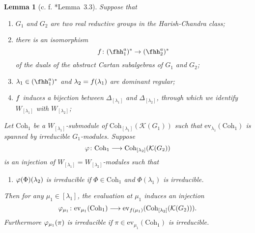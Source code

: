 \documentclass[12pt,a4paper]{amsart}
\newcommand{\CK}{{\mathcal {K}}}
\numberwithin{equation}{section}
\newtheorem{lem}[thm]{Lemma}
\theoremstyle{remark}
\def\Coh{\mathrm{Coh}}
\def\ev#1{{\mathrm{ev}_{#1}}}
\begin{document}
\begin{lem}[{c. f. \cite{GI}*{Lemma~3.3}}]\label{lem:ff.irr} Suppose that
  \begin{enumerate}[label=(\roman*),series=KLff]
    \item \label{it:KLff.1} $G_{1}$ and $G_{2}$ are two real reductive groups in
          the Harish-Chandra class;
    \item there is an isomorphism
          \[ \ff\colon \fhhaso\rightarrow \fhhast
          \]
          of the duals of the abstract Cartan subalgebras of $G_{1}$ and
          $G_{2}$;
    \item $\lambda_{1} \in \fhhaso$ and $\lambda_{2} = f(\lambda_{1})$ are
          dominant regular;
    \item %
          $f$ induces a bijection between $\Delta _{[\lambda_{1}]}$ and
          $\Delta _{[\lambda_{2}]}$, through which we identify
          $W_{[\lambda_{1}]}$ with $W_{[\lambda_{2}]}$;
  \end{enumerate}
  Let $\Coh_{1}$ be a $W_{[\lambda_{1}]}$-submodule of
  $\Coh_{[\lambda_{1}]}(\CK(G_{1}))$ such that $\ev{\lambda_{1}}(\Coh_{1})$ is
  spanned by irreducible $G_{1}$-modules. Suppose
  \begin{equation}\label{eq:coh.ff}
    \ffcoh\colon \Coh_{1}\longrightarrow \Coh_{[\lambda_{2}]}(\CK(G_{2}))
  \end{equation}
  is an injection of $W_{[\lambda_{1}]}=W_{[\lambda_{2}]}$-modules such
  that
  \begin{enumerate}[KLff]
    \item \label{it:KLff.5} $\varphi(\Phi)(\lambda_{2})$ is irreducible if $\Phi\in \Coh_{1}$
          and $\Phi(\lambda_{1})$ is irreducible.
  \end{enumerate}

  Then for any $\mu_{1}\in [\lambda_{1}]$, the evaluation at $\mu_{1}$ induces
  an injection
  \[
    \ffcoh_{\mu_{1}} \colon \ev{\mu_{1}}(\Coh_{1}) \longrightarrow \ev{\ff(\mu_{1})}(\Coh_{[\lambda_{2}]}(\CK(G_{2}))). 
  \]
 Furthermore $\varphi_{\mu_{1}}(\pi)$ is irreducible if $\pi \in \ev{\mu_{1}}(\Coh_{1})$ is irreducible.
\end{lem}
\end{document}
